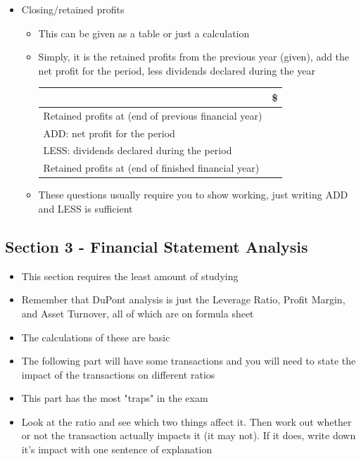 \documentclass{article}
\begin{document}
\begin{itemize}
\begin{itemize}
					\item Everything other than the section below "Less expenses:" is guaranteed to have that layout, so memorise it
					\item Gross profit refers to $\text{Revenue} - \text{COGS}$ whereas net profit includes all additional costs of a company
				\end{itemize}
			\item Closing/retained profits
				\begin{itemize}
					\item This can be given as a table or just a calculation
					\item Simply, it is the retained profits from the previous year (given), add the net profit for the period, less dividends declared during the year
						\begin{table}[H]
							\centering
							\begin{tabular}[c]{p{8cm}|m{4cm}}
								\hline
								& \multicolumn{1}{c}{\$}	\\
								\hline
								Retained profits at (end of previous financial year)	&	\\
								ADD: net profit for the period		&	\\
								LESS: dividends declared during the period &	\\
								\hline
								Retained profits at (end of finished financial year)	&	\\
								\hline
							\end{tabular}
						\end{table}
					\item These questions usually require you to show working, just writing ADD and LESS is sufficient
				\end{itemize}
		\end{itemize}

	\subsection{Section 3 - Financial Statement Analysis}

		\begin{itemize}
			\item This section requires the least amount of studying
			\item Remember that DuPont analysis is just the Leverage Ratio, Profit Margin, and Asset Turnover, all of which are on formula sheet
			\item The calculations of these are basic
			\item The following part will have some transactions and you will need to state the impact of the transactions on different ratios
			\item This part has the most "traps" in the exam
			\item Look at the ratio and see which two things affect it. Then work out whether or not the transaction actually impacts it (it may not). If it does, write down it's impact with one sentence of explanation 
		\end{itemize}
\end{document}
